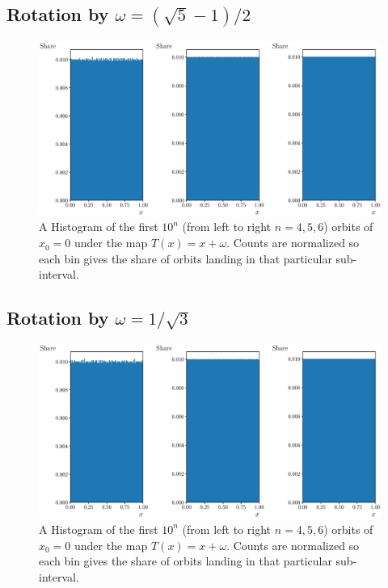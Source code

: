 \documentclass{article}
\begin{document}
\subsection*{Rotation by $\omega = (\sqrt{5} -1)/2$}

\begin{figure}[H]
	\centering
	\includegraphics[scale = 0.55]{Q100_Hist_Rot_root5.eps}
	\caption{A Histogram of the first $10^n$ (from left to right $n = 4,5,6$) orbits of $x_0 = 0$ under the map $T(x) = x + \omega$. 
	Counts are normalized so each bin gives the share of orbits landing in that particular sub-interval.}
\end{figure}

\subsection*{Rotation by $\omega = 1/\sqrt{3}$}

\begin{figure}[H]
	\centering
	\includegraphics[scale = 0.55]{Q100_Hist_Rot_root3.eps}
	\caption{A Histogram of the first $10^n$ (from left to right $n = 4,5,6$) orbits of $x_0 = 0$ under the map $T(x) = x + \omega$. 
	Counts are normalized so each bin gives the share of orbits landing in that particular sub-interval.}
\end{figure}
\end{document}
